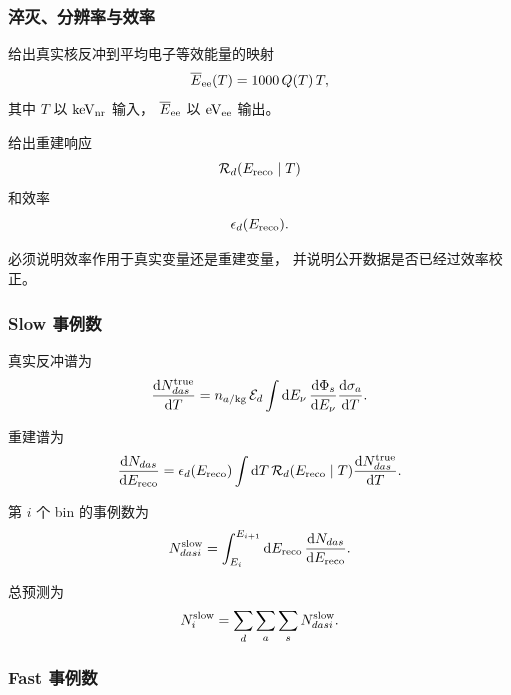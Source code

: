 \subsubsection{淬灭、分辨率与效率}

给出真实核反冲到平均电子等效能量的映射
\begin{equation}
  \overline E_{\rm ee}(T)
  =
  1000\,Q(T)\,T,
\end{equation}
其中 $T$ 以 $\mathrm{keV_{nr}}$ 输入，
$\overline E_{\rm ee}$ 以 $\mathrm{eV_{ee}}$ 输出。

给出重建响应
\begin{equation}
  \mathcal R_d(E_{\rm reco}\mid T)
\end{equation}
和效率
\begin{equation}
  \epsilon_d(E_{\rm reco}).
\end{equation}

必须说明效率作用于真实变量还是重建变量，
并说明公开数据是否已经过效率校正。

\subsubsection{Slow 事例数}

真实反冲谱为
\begin{equation}
  \frac{\mathrm d N_{das}^{\rm true}}{\mathrm d T}
  =
  n_{a/{\rm kg}}\,
  \mathcal E_d
  \int
  \mathrm d E_\nu\,
  \frac{\mathrm d\Phi_s}{\mathrm d E_\nu}
  \frac{\mathrm d\sigma_a}{\mathrm d T}.
\end{equation}

重建谱为
\begin{equation}
  \frac{\mathrm d N_{das}}
  {\mathrm d E_{\rm reco}}
  =
  \epsilon_d(E_{\rm reco})
  \int
  \mathrm d T\,
  \mathcal R_d(E_{\rm reco}\mid T)
  \frac{\mathrm d N_{das}^{\rm true}}{\mathrm d T}.
\end{equation}

第 $i$ 个 bin 的事例数为
\begin{equation}
  N_{dasi}^{\rm slow}
  =
  \int_{E_i}^{E_{i+1}}
  \mathrm d E_{\rm reco}\,
  \frac{\mathrm d N_{das}}
  {\mathrm d E_{\rm reco}}.
\end{equation}

总预测为
\begin{equation}
  N_i^{\rm slow}
  =
  \sum_d\sum_a\sum_s
  N_{dasi}^{\rm slow}.
\end{equation}

\subsubsection{Fast 事例数}

